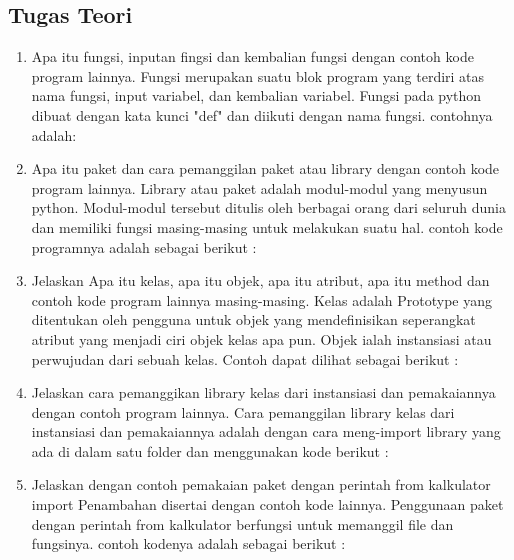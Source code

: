 \subsection{Tugas Teori}
\begin{enumerate}
\item Apa itu fungsi, inputan fingsi dan kembalian fungsi dengan contoh kode program
lainnya.\newline
Fungsi merupakan suatu blok program yang terdiri atas nama fungsi, input variabel, dan kembalian variabel. 
Fungsi pada python dibuat dengan kata kunci "def" dan diikuti dengan nama fungsi. contohnya adalah:


\item Apa itu paket dan cara pemanggilan paket atau library dengan contoh kode program lainnya.\newline
Library atau paket adalah modul-modul yang menyusun python. Modul-modul tersebut ditulis oleh berbagai orang dari seluruh dunia dan memiliki fungsi masing-masing untuk melakukan suatu hal. contoh kode programnya adalah sebagai berikut :


\item Jelaskan Apa itu kelas, apa itu objek, apa itu atribut, apa itu method dan contoh kode program lainnya masing-masing.\newline
Kelas adalah Prototype yang ditentukan oleh pengguna untuk objek yang mendefinisikan seperangkat atribut yang menjadi ciri objek kelas apa pun. Objek ialah instansiasi atau perwujudan dari sebuah kelas. Contoh dapat dilihat sebagai berikut :


\item Jelaskan cara pemanggikan library kelas dari instansiasi dan pemakaiannya dengan contoh program lainnya.\newline
Cara pemanggilan  library kelas dari instansiasi dan pemakaiannya adalah dengan cara meng-import library yang ada di dalam satu folder dan menggunakan kode berikut :


\item Jelaskan dengan contoh pemakaian paket dengan perintah from kalkulator import Penambahan disertai dengan contoh kode lainnya.\newline
Penggunaan paket dengan perintah from kalkulator berfungsi untuk memanggil file dan fungsinya. contoh kodenya adalah sebagai berikut :



\end{enumerate}
